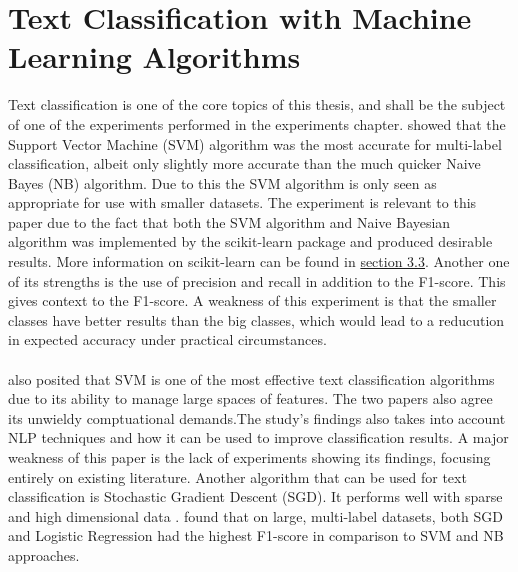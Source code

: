 \documentclass[oneside,12pt]{Classes/RoboticsLaTeX}
\begin{document}
\section{Text Classification with Machine Learning Algorithms}
Text classification is one of the core topics of this thesis, and shall be the subject of one of the experiments performed in the experiments chapter. \citet{Chinese_textC} showed that the Support Vector Machine (SVM) algorithm was the most accurate for 
multi-label classification, albeit only slightly more accurate than the much quicker Naive Bayes (NB) algorithm. Due to this the SVM algorithm is only seen as appropriate for use with smaller datasets. The experiment is relevant to this paper due to the fact
that both the SVM algorithm and Naive Bayesian algorithm was implemented by the scikit-learn package and produced desirable results. More information on scikit-learn can be found in \hyperref[sec:sci-kit_label]{section 3.3}. Another one of its strengths
is the use of precision and recall in addition to the F1-score. This gives context to the F1-score. A weakness of this experiment is that the smaller classes have better results than the big classes, which would lead to a reducution in expected accuracy under
practical circumstances.
\paragraph{}
\citet{Dharmadhikari2011EmpiricalSO} also posited that SVM is one of the most effective text classification algorithms due to its ability to manage large spaces of features. The two papers also agree its unwieldy comptuational 
demands.The study's findings also takes into account NLP techniques and how it can be used to improve classification results. A major weakness of this paper is the lack of experiments showing its findings, focusing entirely on existing literature. Another
algorithm that can be used for text classification is Stochastic Gradient Descent (SGD). It performs well with sparse and high dimensional data \citep{SVM_SGD}. \citet{Arabic_SGD_LR} found that on large, multi-label datasets, both SGD and Logistic Regression
had the highest F1-score in comparison to SVM and NB approaches.
\end{document}
